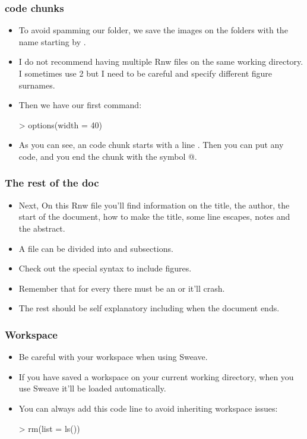 \begin{frame}
  \frametitle{ code chunks}
  \begin{itemize}
  \item To avoid spamming our folder, we save the images on the  folders with the name starting by .
  \item I do not recommend having multiple Rnw files on the same working directory. I sometimes use 2 but I need to be careful and specify different figure surnames.
  \item Then we have our first  command:
\begin{Schunk}
\begin{Sinput}
> options(width = 40)
\end{Sinput}
\end{Schunk}
  \item As you can see, an  code chunk starts with a line . Then you can put any  code, and you end the chunk with the symbol @.
  \end{itemize}
\end{frame}

\begin{frame}[allowframebreaks]
  \frametitle{The rest of the doc}
  \begin{itemize}
  \item Next, On this Rnw file you'll find information on the title, the author, the start of the document, how to make the title, some line escapes, notes and the abstract.
  \item A file can be divided into  and subsections.
  \item Check out the special syntax to include  figures.
  \item Remember that for every  there must be an  or it'll crash.
  \item The rest should be self explanatory including when the document ends.
  \end{itemize}
\end{frame}

\begin{frame}
  \frametitle{Workspace}
  \begin{itemize}
  \item Be \alert{careful} with your workspace when using Sweave.
  \item If you have saved a workspace on your current working directory, when you use Sweave it'll be loaded automatically.
  \item You can always add this code line to avoid inheriting workspace issues:
\begin{Schunk}
\begin{Sinput}
> rm(list = ls())
\end{Sinput}
\end{Schunk}
  \end{itemize}
\end{frame}

